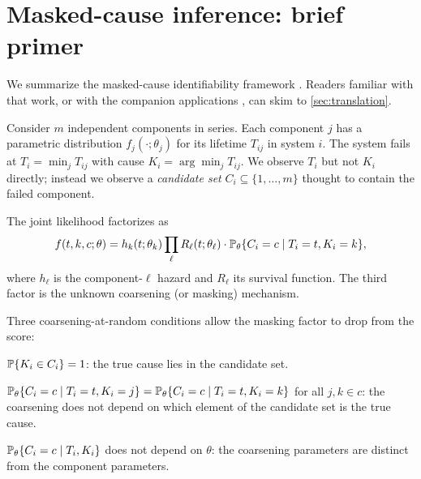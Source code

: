 \section{Masked-cause inference: brief primer}
\label{sec:background}

We summarize the masked-cause identifiability framework
\citep{towell2026masked,heitjan1991ignorability,gill1997coarsening}.
Readers familiar with that work, or with the companion applications
\citep{towell2026scrnacoarsening,towell2026spatialcoarsening}, can
skim to \cref{sec:translation}.

Consider $m$ independent components in series. Each component $j$ has
a parametric distribution $f_j(\cdot;\theta_j)$ for its lifetime
$T_{ij}$ in system $i$. The system fails at $T_i = \min_j T_{ij}$
with cause $K_i = \arg\min_j T_{ij}$. We observe $T_i$ but not $K_i$
directly; instead we observe a \emph{candidate set} $C_i \subseteq
\{1,\ldots,m\}$ thought to contain the failed component.

The joint likelihood factorizes as
\begin{equation}
  f(t, k, c; \theta)
  = h_k(t; \theta_k) \prod_{\ell} R_\ell(t; \theta_\ell)
    \cdot \mathbb{P}_\theta\{C_i = c \mid T_i = t, K_i = k\},
  \label{eq:bg-joint}
\end{equation}
where $h_\ell$ is the component-$\ell$ hazard and $R_\ell$ its
survival function. The third factor is the unknown coarsening (or
masking) mechanism.

Three coarsening-at-random conditions allow the masking factor to
drop from the score:

\begin{condition}[Support, C1]
\label{cond:c1}
$\mathbb{P}\{K_i \in C_i\} = 1$: the true cause lies in the candidate set.
\end{condition}

\begin{condition}[Symmetry, C2]
\label{cond:c2}
$\mathbb{P}_\theta\{C_i=c \mid T_i=t, K_i=j\} = \mathbb{P}_\theta\{C_i=c \mid
T_i=t, K_i=k\}$ for all $j,k \in c$: the coarsening does not depend on
which element of the candidate set is the true cause.
\end{condition}

\begin{condition}
\label{cond:c3}
$\mathbb{P}_\theta\{C_i=c \mid T_i, K_i\}$ does not depend on $\theta$: the
coarsening parameters are distinct from the component parameters.
\end{condition}

